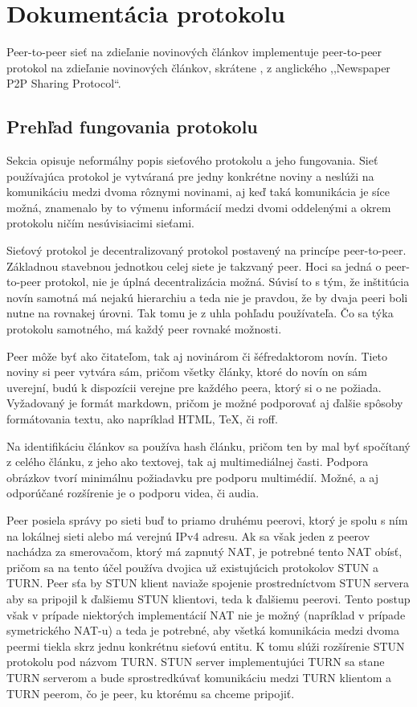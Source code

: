 \chapter{Dokumentácia protokolu}

Peer-to-peer sieť na zdieľanie novinových článkov implementuje peer-to-peer protokol na zdieľanie novinových článkov, skrátene \npps{}, z anglického ,,Newspaper P2P Sharing Protocol``.

\section{Prehľad fungovania protokolu}

Sekcia opisuje neformálny popis sieťového protokolu \npps{} a jeho fungovania. Sieť používajúca protokol je vytváraná pre jedny konkrétne noviny a neslúži na komunikáciu medzi dvoma rôznymi novinami, aj keď taká komunikácia je síce možná, znamenalo by to výmenu informácií medzi dvomi oddelenými a okrem protokolu ničím nesúvisiacimi sieťami.

Sieťový protokol \npps{} je decentralizovaný protokol postavený na princípe peer-to-peer. Základnou stavebnou jednotkou celej siete je takzvaný peer. Hoci sa jedná o peer-to-peer protokol, nie je úplná decentralizácia možná. Súvisí to s tým, že inštitúcia novín samotná má nejakú hierarchiu a teda nie je pravdou, že by dvaja peeri boli nutne na rovnakej úrovni. Tak tomu je z uhla pohľadu používateľa. Čo sa týka protokolu samotného, má každý peer rovnaké možnosti.

Peer môže byť ako čitateľom, tak aj novinárom či šéfredaktorom novín. Tieto noviny si peer vytvára sám, pričom všetky články, ktoré do novín on sám uverejní, budú k dispozícii verejne pre každého peera, ktorý si o ne požiada. Vyžadovaný je formát markdown, pričom je možné podporovať aj ďalšie spôsoby formátovania textu, ako napríklad HTML, TeX, či roff.

Na identifikáciu článkov sa používa hash článku, pričom ten by mal byť spočítaný z celého článku, z jeho ako textovej, tak aj multimediálnej časti. Podpora obrázkov tvorí minimálnu požiadavku pre podporu multimédií. Možné, a aj odporúčané rozšírenie je o podporu videa, či audia.

Peer posiela správy po sieti buď to priamo druhému peerovi, ktorý je spolu s ním na lokálnej sieti alebo má verejnú IPv4 adresu. Ak sa však jeden z peerov nachádza za smerovačom, ktorý má zapnutý NAT, je potrebné tento NAT obísť, pričom sa na tento účel používa dvojica už existujúcich protokolov STUN a TURN. Peer sťa by STUN klient naviaže spojenie prostredníctvom STUN servera aby sa pripojil k ďalšiemu STUN klientovi, teda k ďalšiemu peerovi. Tento postup však v prípade niektorých implementácií NAT nie je možný (napríklad v prípade symetrického NAT-u) a teda je potrebné, aby všetká komunikácia medzi dvoma peermi tiekla skrz jednu konkrétnu sieťovú entitu. K tomu slúži rozšírenie STUN protokolu pod názvom TURN. STUN server implementujúci TURN sa stane TURN serverom a bude sprostredkúvať komunikáciu medzi TURN klientom a TURN peerom, čo je \npps{} peer, ku ktorému sa chceme pripojiť. 

